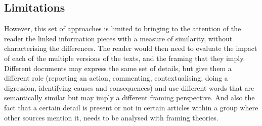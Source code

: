 







\subsection{Limitations}
\label{ssec:lit_relationships_limitations}

However, this set of approaches is limited to bringing to the attention of the reader the linked information pieces with a measure of similarity, without characterising the differences.
The reader would then need to evaluate the impact of each of the multiple versions of the texts, and the framing that they imply. 
Different documents may express the same set of details, but give them a different role (reporting an action, commenting, contextualising, doing a digression, identifying causes and consequences) and use different words that are semantically similar but may imply a different framing perspective.
And also the fact that a certain detail is present or not in certain articles within a group where other sources mention it, needs to be analysed with framing theories.


